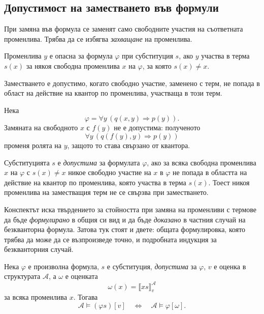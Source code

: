 \subsection{Допустимост на заместването във формули}\label{s:21.4.2}

При замяна във формула се заменят само свободните участия на съответната променлива. Трябва да се избягва \emph{захващане} на променлива.

\begin{defn}
Променлива $y$ е опасна за формула $\varphi$ при субституция $s$, ако $y$ участва в терма $s(x)$ за някоя свободна променлива $x$ на $\varphi$, за която $s(x)\ne x$.
\end{defn}

Заместването е допустимо, когато свободно участие, заменено с терм, не попада в област на действие на квантор по променлива, участваща в този терм.

\begin{example}
Нека
\[
\varphi=\forall y\,(q(x,y)\Rightarrow p(y)).
\]
Замяната на свободното $x$ с $f(y)$ не е допустима: полученото
\[
\forall y\,(q(f(y),y)\Rightarrow p(y))
\]
променя ролята на $y$, защото то става свързано от квантора.
\end{example}

\begin{defn}
Субституцията $s$ е \emph{допустима} за формулата $\varphi$, ако за всяка
свободна променлива $x$ на $\varphi$ с $s(x)\ne x$ никое свободно участие на $x$
в $\varphi$ не попада в областта на действие на квантор по променлива, която
участва в терма $s(x)$. Тоест никоя променлива на заместващия терм не се
свързва при заместването.
\end{defn}

Конспектът иска твърдението за стойността при замяна на променливи с термове да
бъде \emph{формулирано} в общия си вид и да бъде \emph{доказано} в частния случай
на безкванторна формула. Затова тук стоят и двете: общата формулировка, която
трябва да може да се възпроизведе точно, и подробната индукция за безкванторния
случай.

\begin{keythm}
Нека $\varphi$ е произволна формула, $s$ е субституция, \emph{допустима} за
$\varphi$, $v$ е оценка в структурата $\mathcal A$, а $\omega$ е оценката
\[
\omega(x)=\llbracket xs\rrbracket^{\mathcal A}_v
\]
за всяка променлива $x$. Тогава
\[
\mathcal A\models(\varphi s)[v]
\quad\Longleftrightarrow\quad
\mathcal A\models\varphi[\omega].
\]
\end{keythm}

